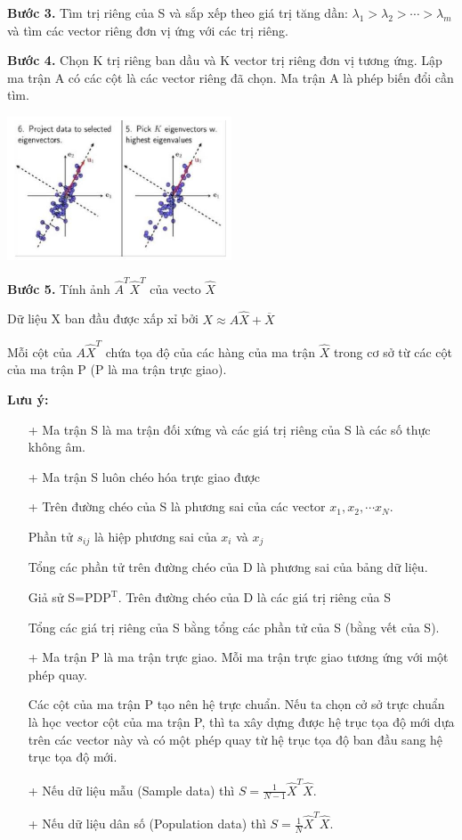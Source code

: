 \documentclass[12pt,a4paper]{article}
\begin{document}
\textbf{Bước 3.} Tìm trị riêng của S và sắp xếp theo giá trị tăng dần: $\lambda_1 > \lambda_2 > \cdots > \lambda_m$ và tìm các vector riêng đơn vị ứng với các trị riêng.

\textbf{Bước 4.} Chọn K trị riêng ban dầu và K vector trị riêng đơn vị tương ứng. Lập ma trận A có các cột là các vector riêng đã chọn. Ma trận A là phép biến đổi cần tìm.

\begin{center}
    \includegraphics[width = 0.5\textwidth]{5.png}
\end{center}

\textbf{Bước 5.} Tính ảnh $\widehat{A}^T \widehat{X}^T$ của vecto $\widehat{X}$

Dữ liệu X ban đầu được xấp xỉ bởi $X \approx A\widehat{X} + \overline{X}$

Mỗi cột của $A\widehat{X}^T$ chứa tọa độ của các hàng của ma trận $\widehat{X}$ trong cơ sở từ các cột của ma trận P (P là ma trận trực giao).

\textbf{Lưu ý:}
\begin{itemize}
    \item[+] Ma trận S là ma trận đối xứng và các giá trị riêng của S là các số thực không âm.
    \item[+] Ma trận S luôn chéo hóa trực giao được
    \item[+] Trên đường chéo của S là phương sai của các vector $x_1, x_2, \cdots x_N$.
    
    Phần tử $s_{ij}$ là hiệp phương sai của $x_i$ và $x_j$

    Tổng các phần tử trên đường chéo của D là phương sai của bảng dữ liệu.

    Giả sử S=PD$\text{P}^\text{T}$. Trên đường chéo của D là các giá trị riêng của S

    Tổng các giá trị riêng của S bằng tổng các phần tử của S (bằng vết của S).
    \item[+] Ma trận P là ma trận trực giao. Mỗi ma trận trực giao tương ứng với một phép quay.
    
    Các cột của ma trận P tạo nên hệ trực chuẩn. Nếu ta chọn cở sở trực chuẩn là học vector cột của ma trận P, thì ta xây dựng được hệ trục tọa độ mới dựa trên các vector này và có một phép quay từ hệ trục tọa độ ban đầu sang hệ trục tọa độ mới.
    \item[+] Nếu dữ liệu mẫu (Sample data) thì $S = \frac{1}{N-1}\widehat{X}^T \widehat{X}$.
    \item[+] Nếu dữ liệu dân số (Population data) thì $S = \frac{1}{N}\widehat{X}^T \widehat{X}$.
\end{itemize}
\end{document}
